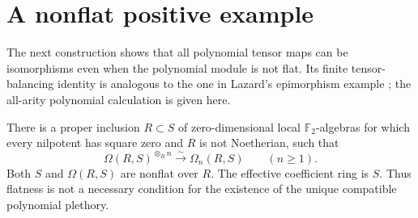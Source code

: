 \section{A nonflat positive example}
The next construction shows that all polynomial tensor maps can be
isomorphisms even when the polynomial module is not flat. Its finite
tensor-balancing identity is analogous to the one in Lazard's
epimorphism example \cite[Section 110.36, Tag 06RH]{StacksLazardExample};
the all-arity polynomial calculation is given here.

\begin{theorem}\label{thm:nonflat-forest-plethory}
There is a proper inclusion $R\subset S$ of zero-dimensional local
$\mathbb F_2$-algebras for which every nilpotent has square zero and
$R$ is not Noetherian, such that
\[
          \Omega(R,S)^{\otimes_R n}\xrightarrow{\sim}\Omega_n(R,S)
                         \qquad(n\ge1).
\]
Both $S$ and $\Omega(R,S)$ are nonflat over $R$. The effective
coefficient ring is $S$. Thus flatness is not a necessary condition
for the existence of the unique compatible polynomial plethory.
\end{theorem}
